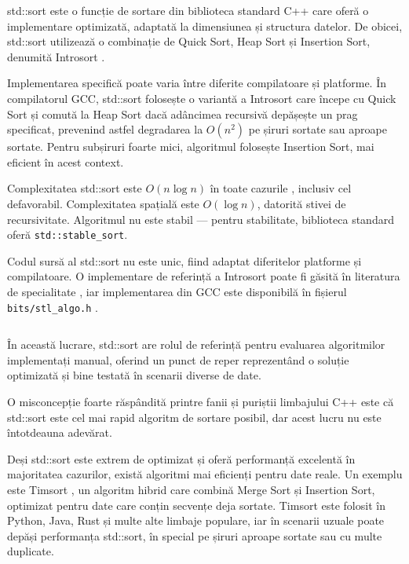 \documentclass[9pt,a4paper,twocolumn,twoside]{rho-class/rho}
\begin{document}
std::sort este o funcție de sortare din biblioteca standard C++ care oferă o implementare optimizată, adaptată la dimensiunea și structura datelor. De obicei, std::sort utilizează o combinație de Quick Sort, Heap Sort și Insertion Sort, denumită Introsort \cite{musser1997introsort, cppreference_sort}.

Implementarea specifică poate varia între diferite compilatoare și platforme. În compilatorul GCC, std::sort folosește o variantă a Introsort care începe cu Quick Sort și comută la Heap Sort dacă adâncimea recursivă depășește un prag specificat, prevenind astfel degradarea la $O(n^2)$ pe șiruri sortate sau aproape sortate. Pentru subșiruri foarte mici, algoritmul folosește Insertion Sort, mai eficient în acest context.

Complexitatea std::sort este $O(n \log n)$ în toate cazurile \cite{musser1997introsort}, inclusiv cel defavorabil. Complexitatea spațială este $O(\log n)$, datorită stivei de recursivitate. Algoritmul nu este stabil — pentru stabilitate, biblioteca standard oferă \texttt{std::stable\_sort}.

Codul sursă al std::sort nu este unic, fiind adaptat diferitelor platforme și compilatoare. O implementare de referință a Introsort poate fi găsită în literatura de specialitate \cite{musser1997introsort}, iar implementarea din GCC este disponibilă în fișierul \texttt{bits/stl\_algo.h} \cite{gcc_stl_algo}.

\begin{code}
    \inputminted[style=friendly]{cpp}{cod_sursa/stdsort.cpp}
    \caption{Funcția "caller" pentru std::sort în stl\_algo.h.}
    \label{lst:stdsort}
\end{code}

În această lucrare, std::sort are rolul de referință pentru evaluarea algoritmilor implementați manual, oferind un punct de reper reprezentând o soluție optimizată și bine testată în scenarii diverse de date.

O misconcepție foarte răspândită printre fanii și puriștii limbajului C++ este că std::sort este cel mai rapid algoritm de sortare posibil, dar acest lucru nu este întotdeauna adevărat.

Deși std::sort este extrem de optimizat și oferă performanță excelentă în majoritatea cazurilor, există algoritmi mai eficienți pentru date reale.
\newline
Un exemplu este Timsort \cite{timsort}, un algoritm hibrid care combină Merge Sort și Insertion Sort, optimizat pentru date care conțin secvențe deja sortate. Timsort este folosit în Python, Java, Rust și multe alte limbaje populare, iar în scenarii uzuale poate depăși performanța std::sort, în special pe șiruri aproape sortate sau cu multe duplicate.
\end{document}
